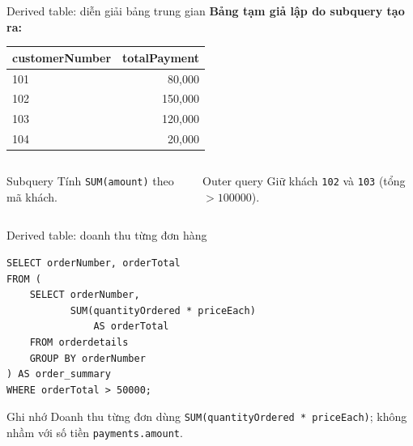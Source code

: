 \documentclass[aspectratio=169,10pt]{beamer}
\newcommand{\code}[1]{\texttt{#1}}
\begin{document}
\begin{frame}[fragile]{Derived table: diễn giải bảng trung gian}
\small \textbf{Bảng tạm giả lập do subquery tạo ra:}
\begin{center}
\begin{tabular}{lr}\toprule
customerNumber & totalPayment\\\midrule
101 & 80,000\\
102 & 150,000\\
103 & 120,000\\
104 & 20,000\\\bottomrule
\end{tabular}
\end{center}
\vspace{.1em}
\begin{columns}[T,onlytextwidth]
\begin{block}{Subquery}
Tính \code{SUM(amount)} theo mã khách.
\end{block}
\begin{block}{Outer query}
Giữ khách \code{102} và \code{103} (tổng $>100000$).
\end{block}
\end{columns}
\end{frame}

\begin{frame}[fragile]{Derived table: doanh thu từng đơn hàng}
\begin{lstlisting}
SELECT orderNumber, orderTotal
FROM (
    SELECT orderNumber,
           SUM(quantityOrdered * priceEach)
               AS orderTotal
    FROM orderdetails
    GROUP BY orderNumber
) AS order_summary
WHERE orderTotal > 50000;
\end{lstlisting}
\begin{block}{Ghi nhớ}
\small Doanh thu từng đơn dùng \code{SUM(quantityOrdered * priceEach)}; không nhầm với số tiền \code{payments.amount}.
\end{block}
\end{frame}
\end{document}
